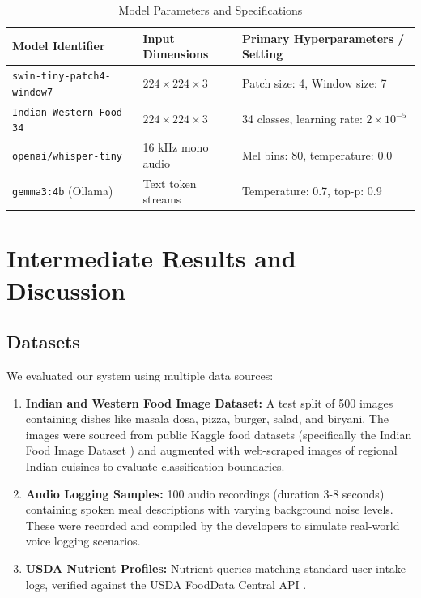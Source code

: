 \documentclass[12pt,a4paper,oneside]{report}
\begin{document}
\begin{table}[H]
    \centering
    \caption{Model Parameters and Specifications}
    \label{tab:model_specs}
    \begin{tabular}{lll}
        \toprule
        \textbf{Model Identifier} & \textbf{Input Dimensions} & \textbf{Primary Hyperparameters / Setting} \\
        \midrule
        \texttt{swin-tiny-patch4-window7} & $224 \times 224 \times 3$ & Patch size: 4, Window size: 7 \\
        \texttt{Indian-Western-Food-34} & $224 \times 224 \times 3$ & 34 classes, learning rate: $2\times 10^{-5}$ \\
        \texttt{openai/whisper-tiny} & 16 kHz mono audio & Mel bins: 80, temperature: 0.0 \\
        \texttt{gemma3:4b} (Ollama) & Text token streams & Temperature: 0.7, top-p: 0.9 \\
        \bottomrule
    \end{tabular}
\end{table}


\chapter{Intermediate Results and Discussion}
\label{ch:results}

\section{Datasets}
We evaluated our system using multiple data sources:
\begin{enumerate}
    \item \textbf{Indian and Western Food Image Dataset:} A test split of 500 images containing dishes like masala dosa, pizza, burger, salad, and biryani. The images were sourced from public Kaggle food datasets (specifically the Indian Food Image Dataset \cite{pandey2017indian}) and augmented with web-scraped images of regional Indian cuisines to evaluate classification boundaries.
    \item \textbf{Audio Logging Samples:} 100 audio recordings (duration 3-8 seconds) containing spoken meal descriptions with varying background noise levels. These were recorded and compiled by the developers to simulate real-world voice logging scenarios.
    \item \textbf{USDA Nutrient Profiles:} Nutrient queries matching standard user intake logs, verified against the USDA FoodData Central API \cite{usda2020fooddata}.
\end{enumerate}
\end{document}
